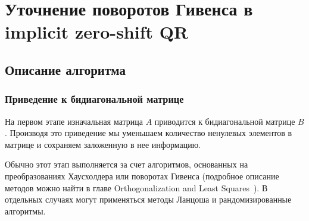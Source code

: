 

\section{Уточнение поворотов Гивенса в implicit zero-shift QR}

\subsection{Описание алгоритма}

\subsubsection{Приведение к бидиагональной матрице}

На первом этапе изначальная матрица $A$ приводится к бидиагональной матрице $B$. Производя это приведение мы уменьшаем количество ненулевых элементов в матрице и сохраняем заложенную в нее информацию.

Обычно этот этап выполняется за счет алгоритмов, основанных на преобразованиях Хаусхолдера или поворотах Гивенса (подробное описание методов можно найти в главе Orthogonalization and Least Squares~\cite{Golub2013}). В отдельных случаях могут применяться методы Ланцоша и рандомизированные алгоритмы.

